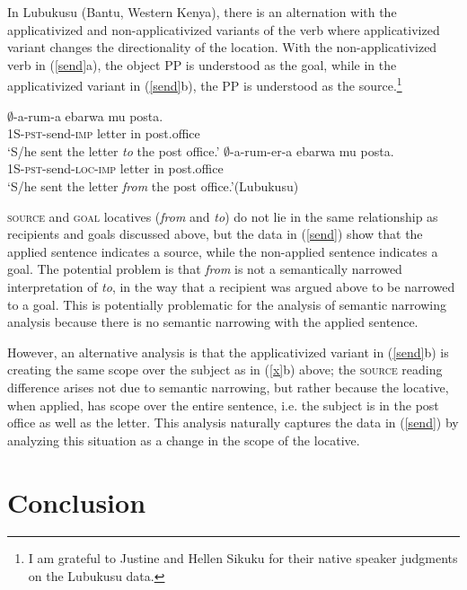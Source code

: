 \documentclass[output=paper]{langsci/langscibook}
\begin{document}
 

 In Lubukusu (Bantu, Western Kenya), there is an alternation with the applicativized and  non-applicativized variants of the verb where applicativized variant changes the directionality of the location. With the non-applicativized verb in (\ref{send}a), the object PP is understood as the goal, while in the applicativized variant in (\ref{send}b), the PP is understood as the source.\footnote{I am grateful to Justine and Hellen Sikuku for their native speaker judgments on the Lubukusu data.}

\begin{exe}
\ex\label{send} 
\begin{xlist}
\ex\gll $\emptyset$-a-rum-a ebarwa mu posta.\\
			{\scshape 1S-pst-}send-{\scshape imp} letter in post.office\\
			\glt `S/he sent the letter \emph{to} the post office.'
\ex\gll $\emptyset$-a-rum-er-a ebarwa mu posta.\\
			{\scshape 1S-pst-}send-{\scshape loc-imp} letter in post.office\\
			\glt `S/he sent the letter \emph{from} the post office.'\hfill (Lubukusu)
			\end{xlist}
\end{exe}
%
 {\scshape source} and {\scshape goal}  locatives (\emph{from} and \emph{to}) do not lie in the same relationship as recipients and goals discussed above, but the data in (\ref{send}) show that the applied sentence indicates a source, while the non-applied sentence indicates a goal. The potential problem is that \emph{from} is not a semantically narrowed interpretation of \emph{to}, in the way that a recipient was argued above to be narrowed to a goal. This is potentially problematic for the analysis of semantic narrowing analysis because there is no semantic narrowing with the applied sentence. 
 
 However, an alternative analysis is that the applicativized variant in (\ref{send}b) is creating the same scope over the subject as in (\ref{x}b) above; the {\scshape source} reading difference arises not due to semantic narrowing, but rather because the locative, when applied, has scope over the entire sentence, i.e. the subject is in the post office as well as the letter. This analysis naturally captures the data in (\ref{send}) by analyzing this situation as a change in the scope of the locative.
 \fi
 \section{Conclusion}%
 \label{sec:jerro:6}
  
\end{document}
